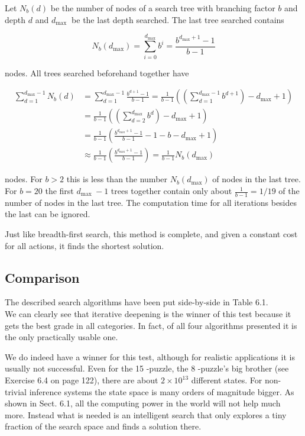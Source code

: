 \documentclass[10pt]{book}
\begin{document}
Let $N_{b}(d)$ be the number of nodes of a search tree with branching factor $b$ and depth $d$ and $d_{\text {max }}$ be the last depth searched. The last tree searched contains

$$
N_{b}\left(d_{\max }\right)=\sum_{i=0}^{d_{\max }} b^{i}=\frac{b^{d_{\max }+1}-1}{b-1}
$$

nodes. All trees searched beforehand together have

$$
\begin{aligned}
\sum_{d=1}^{d_{\max }-1} N_{b}(d) & =\sum_{d=1}^{d_{\max }-1} \frac{b^{d+1}-1}{b-1}=\frac{1}{b-1}\left(\left(\sum_{d=1}^{d_{\max }-1} b^{d+1}\right)-d_{\max }+1\right) \\
& =\frac{1}{b-1}\left(\left(\sum_{d=2}^{d_{\max }} b^{d}\right)-d_{\max }+1\right) \\
& =\frac{1}{b-1}\left(\frac{b^{d_{\max }+1}-1}{b-1}-1-b-d_{\max }+1\right) \\
& \approx \frac{1}{b-1}\left(\frac{b^{d_{\max }+1}-1}{b-1}\right)=\frac{1}{b-1} N_{b}\left(d_{\max }\right)
\end{aligned}
$$

nodes. For $b>2$ this is less than the number $N_{b}\left(d_{\max }\right)$ of nodes in the last tree. For $b=20$ the first $d_{\text {max }}-1$ trees together contain only about $\frac{1}{b-1}=1 / 19$ of the number of nodes in the last tree. The computation time for all iterations besides the last can be ignored.

Just like breadth-first search, this method is complete, and given a constant cost for all actions, it finds the shortest solution.

\subsection{Comparison}
The described search algorithms have been put side-by-side in Table 6.1.\\
We can clearly see that iterative deepening is the winner of this test because it gets the best grade in all categories. In fact, of all four algorithms presented it is the only practically usable one.

We do indeed have a winner for this test, although for realistic applications it is usually not successful. Even for the 15 -puzzle, the 8 -puzzle's big brother (see Exercise 6.4 on page 122), there are about $2 \times 10^{13}$ different states. For non-trivial inference systems the state space is many orders of magnitude bigger. As shown in Sect. 6.1, all the computing power in the world will not help much more. Instead what is needed is an intelligent search that only explores a tiny fraction of the search space and finds a solution there.
\end{document}
